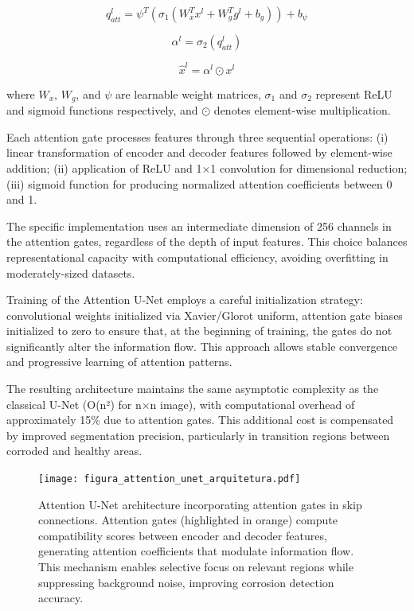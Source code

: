 \documentclass[12pt,a4paper,twoside]{article}
\begin{document}
\begin{equation}
q_{att}^l = \psi^T(\sigma_1(W_x^T x^l + W_g^T g^l + b_g)) + b_{\psi}
\end{equation}

\begin{equation}
\alpha^l = \sigma_2(q_{att}^l)
\end{equation}

\begin{equation}
\hat{x}^l = \alpha^l \odot x^l
\end{equation}

where $W_x$, $W_g$, and $\psi$ are learnable weight matrices, $\sigma_1$ and $\sigma_2$ represent ReLU and sigmoid functions respectively, and $\odot$ denotes element-wise multiplication.

Each attention gate processes features through three sequential operations: (i) linear transformation of encoder and decoder features followed by element-wise addition; (ii) application of ReLU and 1×1 convolution for dimensional reduction; (iii) sigmoid function for producing normalized attention coefficients between 0 and 1.

The specific implementation uses an intermediate dimension of 256 channels in the attention gates, regardless of the depth of input features. This choice balances representational capacity with computational efficiency, avoiding overfitting in moderately-sized datasets.

Training of the Attention U-Net employs a careful initialization strategy: convolutional weights initialized via Xavier/Glorot uniform, attention gate biases initialized to zero to ensure that, at the beginning of training, the gates do not significantly alter the information flow. This approach allows stable convergence and progressive learning of attention patterns.

The resulting architecture maintains the same asymptotic complexity as the classical U-Net (O(n²) for n×n image), with computational overhead of approximately 15\% due to attention gates. This additional cost is compensated by improved segmentation precision, particularly in transition regions between corroded and healthy areas.


\begin{figure}[H]
    \centering
    \texttt{[image: figura\_attention\_unet\_arquitetura.pdf]}
    \caption{Attention U-Net architecture incorporating attention gates in skip connections. Attention gates (highlighted in orange) compute compatibility scores between encoder and decoder features, generating attention coefficients that modulate information flow. This mechanism enables selective focus on relevant regions while suppressing background noise, improving corrosion detection accuracy.}
    \label{fig:attention_unet_architecture}
\end{figure}
\end{document}
